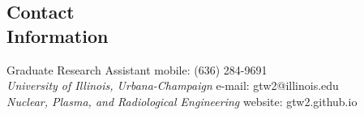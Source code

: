 \documentclass[margin,line]{resume}
\begin{document}
\begin{resume}

    \section{\mysidestyle Contact\\Information}
    Graduate Research Assistant \hfill mobile: (636) 284-9691 \vspace{0mm}\\\vspace{0mm}%
        \textsl{University of Illinois, Urbana-Champaign}
        \hfill e-mail: gtw2@illinois.edu           \vspace{0mm}\\\vspace{0mm}%
    \textsl{Nuclear, Plasma, and Radiological Engineering} \hfill website: gtw2.github.io
        \vspace{0mm}\\\vspace{0mm}%


\end{resume}
\end{document}
